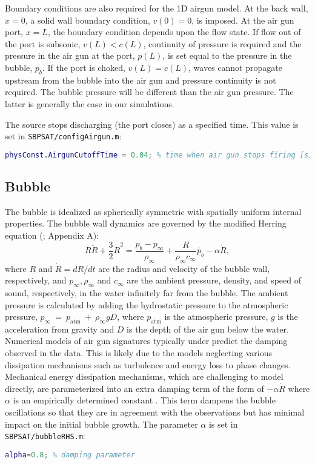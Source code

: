 \documentclass[10pt]{article}
\begin{document}
Boundary conditions are also required for the 1D airgun model. At the back wall, $x=0$, a solid wall boundary condition, $v(0)=0$, is imposed. At the air gun port, $x=L$, the boundary condition depends upon the flow state. If flow out of the port is subsonic, $v(L)<c(L)$, continuity of pressure is required and the pressure in the air gun at the port, $p(L)$, is set equal to the pressure in the bubble, $p_b$. If the port is choked, $v(L)=c(L)$, waves cannot propagate upstream from the bubble into the air gun and pressure continuity is not required. The bubble pressure will be different than the air gun pressure. The latter is generally the case in our simulations.

The source stops discharging (the port closes) as a specified time. This value is set in \texttt{SBPSAT/configAirgun.m}:
\begin{lstlisting}[language=Matlab]
physConst.AirgunCutoffTime = 0.04; % time when air gun stops firing [s]
\end{lstlisting}


\subsection{Bubble}
The bubble is idealized as spherically symmetric with spatially uniform internal properties. The bubble wall dynamics are governed by the modified Herring equation (\citealp{Herring1941,Cole1948,Vokurka1986}; Appendix A):
\begin{equation}
R \ddot{R}+ \frac{3}{2} \dot{R}^2 = \frac{p_b - p_\infty}{\rho_\infty} + \frac{R}{\rho_\infty c_\infty} \dot{p_b} - \alpha \dot{R},
\label{eq:modified herring}
\end{equation}
where $R$ and $\dot{R}=dR/dt$ are the radius and velocity of the bubble wall, respectively, and $p_\infty, \rho_\infty$ and $c_\infty$ are the ambient pressure, density, and speed of sound, respectively, in the water infinitely far from the bubble. The ambient pressure is calculated by adding the hydrostatic pressure to the atmospheric pressure, $p_\infty~=~p_\text{atm}~+~\rho_\infty g D$, where $p_\text{atm}$ is the atmospheric pressure, $g$ is the acceleration from gravity and $D$ is the depth of the air gun below the water. Numerical models of air gun signatures typically under predict the damping observed in the data. This is likely due to the models neglecting various dissipation mechanisms such as turbulence and energy loss to phase changes. Mechanical energy dissipation mechanisms, which are challenging to model directly, are parameterized into an extra damping term of the form of $-\alpha \dot{R}$ where $\alpha$ is an empirically determined constant \citep{Langhammer1996, Watson2017_airgun}. This term dampens the bubble oscillations so that they are in agreement with the observations but has minimal impact on the initial bubble growth. The parameter $\alpha$ is set in \texttt{SBPSAT/bubbleRHS.m}:
\begin{lstlisting}[language=Matlab]
alpha=0.8; % damping parameter 
\end{lstlisting}
\end{document}

